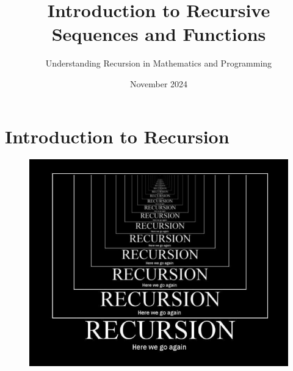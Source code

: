 \documentclass{beamer}
\title[Recursive Sequences \& Functions]{Introduction to Recursive Sequences and Functions}
\subtitle{Understanding Recursion in Mathematics and Programming}
\author[Mr. Gullo]{}
\date[Nov 2024]{November 2024}
\begin{document}
\frame{\titlepage}

\section{Introduction to Recursion}


\begin{frame}
\begin{figure}
    \centering
    \includegraphics[width=1\linewidth]{CS12Recursive Functions/Screenshot 2024-11-11 150024.png}
\end{figure}
    
\end{frame}
\end{document}
